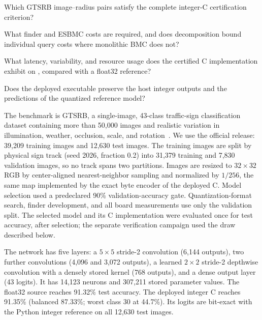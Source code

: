 \begin{tcolorbox}[
    colback=gray!10,
    colframe=gray!50,
    boxrule=0.5pt,
    arc=1mm,
    left=2mm,
    right=2mm,
    top=1mm,
    bottom=1mm
]
\begin{description}[leftmargin=0.55cm,labelsep=0.2em,itemsep=1pt,topsep=0pt]
  \item[RQ1:] Which GTSRB image--radius pairs satisfy the complete integer-C certification criterion?
  \item[RQ2:] What finder and ESBMC costs are required, and does decomposition bound individual query costs where monolithic BMC does not?
  \item[RQ3:] What latency, variability, and resource usage does the certified C implementation exhibit on \AAOS{}, compared with a float32 reference?
  \item[RQ4:] Does the deployed executable preserve the host integer outputs and the predictions of the quantized reference model?
\end{description}
\end{tcolorbox}

The benchmark is GTSRB, a single-image, 43-class traffic-sign classification dataset containing more than 50,000 images and realistic variation in illumination, weather, occlusion, scale, and rotation~\cite{Stallkamp2011GTSRB}. We use the official release: 39,209 training images and 12,630 test images. The training images are split by physical sign track (seed 2026, fraction 0.2) into 31,379 training and 7,830 validation images, so no track spans two partitions. Images are resized to $32\times32$ RGB by center-aligned nearest-neighbor sampling and normalized by $1/256$, the same map implemented by the exact byte encoder of the deployed C. Model selection used a predeclared 90\% validation-accuracy gate. Quantization-format search, finder development, and all board measurements use only the validation split. The selected model and its C implementation were evaluated once for test accuracy, after selection; the separate verification campaign used the draw described below.

The network has five layers: a $5\times5$ stride-2 convolution (6,144 outputs), two further convolutions (4,096 and 3,072 outputs), a learned $2\times2$ stride-2 depthwise convolution with a densely stored kernel (768 outputs), and a dense output layer (43 logits). It has 14,123 neurons and 307,211 stored parameter values. The float32 source reaches 91.32\% test accuracy. The deployed integer C reaches 91.35\% (balanced 87.33\%; worst class 30 at 44.7\%). Its logits are bit-exact with the Python integer reference on all 12,630 test images.

